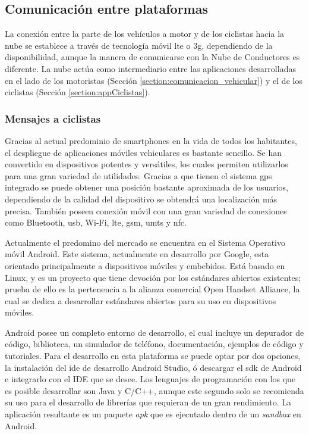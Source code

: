 \subsection{Comunicación entre plataformas}\label{ssection:comunicacion_plataformas}
La conexión entre la parte de los vehículos a motor y de los ciclistas hacia la
nube se establece a través de tecnología móvil \gls{lte} o \gls{3g},
dependiendo de la disponibilidad, aunque la manera de comunicarse con la Nube
de Conductores es diferente. La nube actúa como intermediario entre las
aplicaciones desarrolladas en el lado de los motoristas (Sección
\ref{section:comunicacion_vehicular}) y el de los ciclistas (Sección
\ref{section:appCiclistas}).

\subsubsection{Mensajes a ciclistas}\label{sssection:mensajes_ciclistas}
Gracias al actual predominio de smartphones en la vida de todos los habitantes,
el despliegue de aplicaciones móviles vehiculares es bastante sencillo. Se han
convertido en dispositivos potentes y versátiles, los cuales permiten
utilizarlos para una gran variedad de utilidades. Gracias a que tienen
el sistema \gls{gps} integrado se puede obtener una posición bastante
aproximada de los usuarios, dependiendo de la calidad del dispositivo se
obtendrá una localización más precisa. También poseen conexión móvil con una
gran variedad de conexiones como Bluetooth, \gls{usb}, Wi-Fi, \gls{lte},
\gls{gsm}, \gls{umts} y \gls{nfc}.

Actualmente el predomino del mercado se encuentra en el Sistema Operativo móvil
Android. Este sistema, actualmente en desarrollo por Google, esta orientado
principalmente a dispositivos móviles y embebidos. Está basado en Linux, y es
un proyecto que tiene devoción por los estándares abiertos existentes; prueba
de ello es la pertenencia a la alianza comercial Open Handset Alliance, la cual
se dedica a desarrollar estándares abiertos para su uso en dispositivos móviles.

Android posee un completo entorno de desarrollo, el cual incluye un depurador
de código, biblioteca, un simulador de teléfono, documentación, ejemplos de
código y tutoriales. Para el desarrollo en esta plataforma se puede optar por
dos opciones, la instalación del \gls{ide} de desarrollo Android Studio, ó
descargar el \gls{sdk} de Android e integrarlo con el IDE que se desee. Los
lenguajes de programación con los que es posible desarrollar son Java y C/C++,
aunque este segundo solo se recomienda su uso para el desarrollo de librerías
que requieran de un gran rendimiento. La aplicación resultante es un paquete
\emph{apk} que es ejecutado dentro de un \emph{sandbox} en Android.

